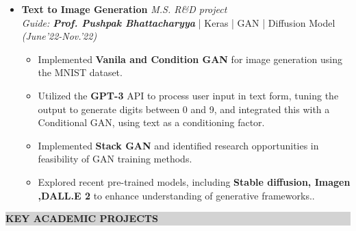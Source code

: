 \documentclass[a4paper,10.5pt]{article}
\newcommand{\lsep}{-0.5cm}
\newcommand{\resheading}[1]{{\small \colorbox{lightgray}{\begin{minipage}{0.975\textwidth}{\textbf{#1 \vphantom{p\^{E}}}}\end{minipage}}}}
\begin{document}
\begin{itemize}
\textbf{Future work:}\\[-0.5cm]
    \begin{itemize}[noitemsep,nolistsep]
        \item Investigating approaches to generalize \textbf{human-crafted} labeling functions for Named Entity Recognition (NER).
        \vspace{0.07cm}
        \item Automating the creation of \textbf{labeling functions} and developing the model into a user-friendly product.
    \end{itemize}
\vspace{-0.1cm}

\item \textbf{Text to Image Generation} \hfill \emph{M.S. R\&D project}\\
\emph{Guide: \textbf{Prof. Pushpak Bhattacharyya}} | {Keras | GAN | Diffusion Model } \hfill \emph{(June'22-Nov.'22)}\\[-0.5cm]

    \begin{itemize}[noitemsep,nolistsep]
        \item Implemented \textbf{Vanila and Condition GAN} for image generation using the MNIST dataset.
        \vspace{0.07cm}
        \item Utilized the \textbf{GPT-3} API to process user input in text form, tuning the output to generate digits between 0 and 9, and integrated this with a Conditional GAN, using text as a conditioning factor.
        \vspace{0.07cm}

        \item Implemented \textbf{Stack GAN} and identified research opportunities in feasibility of GAN training methods.
         \vspace{0.07cm}
        \item Explored recent pre-trained models, including \textbf{Stable diffusion, Imagen ,DALL.E 2} to enhance understanding of generative frameworks..

    \end{itemize}
\vspace{-0.1cm}
\end{itemize}

\resheading{\textbf{KEY ACADEMIC PROJECTS}}\\[\lsep] \\[-0.4cm]
\vspace{0.2cm}
\end{document}
